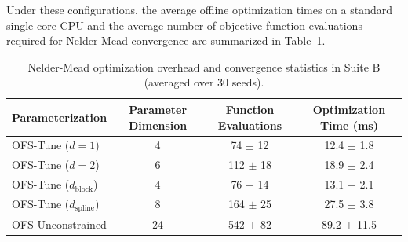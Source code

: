 Under these configurations, the average offline optimization times on a standard single-core CPU and the average number of objective function evaluations required for Nelder-Mead convergence are summarized in Table~\ref{tab:solver_scaling}.

\begin{table}[h]
\caption{Nelder-Mead optimization overhead and convergence statistics in Suite B (averaged over 30 seeds).}
\label{tab:solver_scaling}
\vskip 0.1in
\begin{center}
\begin{small}
\begin{sc}
\begin{tabular}{lccc}
\toprule
Parameterization & Parameter Dimension & Function Evaluations & Optimization Time (ms) \\
\midrule
OFS-Tune ($d=1$) & 4 & 74 $\pm$ 12 & 12.4 $\pm$ 1.8 \\
OFS-Tune ($d=2$) & 6 & 112 $\pm$ 18 & 18.9 $\pm$ 2.4 \\
OFS-Tune ($d_{\text{block}}$) & 4 & 76 $\pm$ 14 & 13.1 $\pm$ 2.1 \\
OFS-Tune ($d_{\text{spline}}$) & 8 & 164 $\pm$ 25 & 27.5 $\pm$ 3.8 \\
OFS-Unconstrained & 24 & 542 $\pm$ 82 & 89.2 $\pm$ 11.5 \\
\bottomrule
\end{tabular}
\end{sc}
\end{small}
\end{center}
\end{table}

